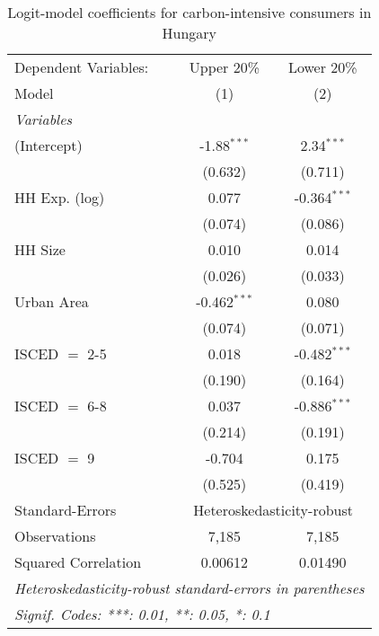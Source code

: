 
\begin{table}[htbp!]
   \centering
   \small
   \begin{adjustbox}{width = 1\textwidth, max height = 0.95\textheight, center}
      \begin{threeparttable}[b]
         \caption{\label{tab:Logit_1_HUN} Logit-model coefficients for carbon-intensive consumers in Hungary}
         \begin{tabular}{lcc}
            \tabularnewline \midrule \midrule
            Dependent Variables: & Upper 20\%     & Lower 20\%\\   
            Model                & (1)            & (2)\\  
            \midrule
            \emph{Variables}\\
            (Intercept)          & -1.88$^{***}$  & 2.34$^{***}$\\   
                                 & (0.632)        & (0.711)\\   
            HH Exp. (log)        & 0.077          & -0.364$^{***}$\\   
                                 & (0.074)        & (0.086)\\   
            HH Size              & 0.010          & 0.014\\   
                                 & (0.026)        & (0.033)\\   
            Urban Area           & -0.462$^{***}$ & 0.080\\   
                                 & (0.074)        & (0.071)\\   
            ISCED $=$ 2-5        & 0.018          & -0.482$^{***}$\\   
                                 & (0.190)        & (0.164)\\   
            ISCED $=$ 6-8        & 0.037          & -0.886$^{***}$\\   
                                 & (0.214)        & (0.191)\\   
            ISCED $=$ 9          & -0.704         & 0.175\\   
                                 & (0.525)        & (0.419)\\   
            \midrule 
            Standard-Errors & \multicolumn{2}{c}{Heteroskedasticity-robust} \\ 
            Observations         & 7,185          & 7,185\\  
            Squared Correlation  & 0.00612        & 0.01490\\  
            \midrule \midrule
            \multicolumn{3}{l}{\emph{Heteroskedasticity-robust standard-errors in parentheses}}\\
            \multicolumn{3}{l}{\emph{Signif. Codes: ***: 0.01, **: 0.05, *: 0.1}}\\
         \end{tabular}
         

\end{threeparttable}
\end{adjustbox}
\end{table}
